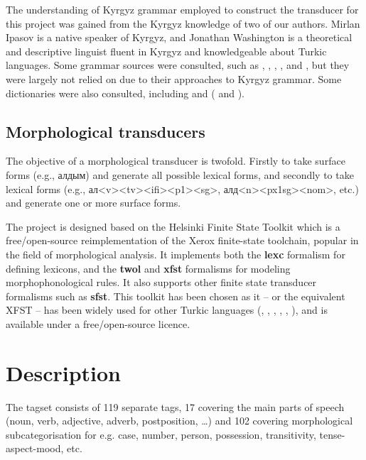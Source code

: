 \documentclass[10pt,a4paper,twocolumn]{article}
\newcommand{\citemultileft}[1]{(\citeauthor{#1}, \citeyear{#1}}
\newcommand{\citemultimid}[1]{\citeauthor{#1}, \citeyear{#1}}
\newcommand{\citemultiright}[1]{\citeauthor{#1}, \citeyear{#1})}
\newcommand{\citetwoyears}[2]{\citeauthor{#1} (\citeyear{#1} and \citeyear{#2})}
\begin{document}
The understanding of Kyrgyz grammar employed to construct the transducer for this project was gained from the Kyrgyz knowledge of two of our authors.  Mirlan Ipasov is a native speaker of Kyrgyz, and Jonathan Washington is a theoretical and descriptive linguist fluent in Kyrgyz and knowledgeable about Turkic languages.  Some grammar sources were consulted, such as \cite{hebertpoppe1963}, \cite{usonalievomuraliev2003}, \cite{qudaybergenov1980}, \cite{somfaikara2003}, and \cite{imart1981}, but they were largely not relied on due to their approaches to Kyrgyz grammar.  Some dictionaries were also consulted, including \cite{jumakunova2005} and \citetwoyears{yudakhin1957}{yudakhin1965}.

\subsection{Morphological transducers}
The objective of a morphological transducer is twofold. Firstly to take surface forms (e.g., алдым) and generate all possible lexical forms, and secondly to take lexical forms (e.g.,  ал<v><tv><ifi><p1><sg>, алд<n><px1sg><nom>, etc.) and generate one or more surface forms. 

The project is designed based on the Helsinki Finite State Toolkit \citep{linden2011} which is a free/open-source reimplementation of the Xerox finite-state toolchain, popular in the field of morphological analysis. It implements both the \textbf{lexc} formalism for defining lexicons, and the \textbf{twol} and \textbf{xfst} formalisms for modeling morphophonological rules. It also supports other finite state transducer formalisms such as \textbf{sfst}. This toolkit has been chosen as it -- or the equivalent XFST -- has been widely used for other Turkic languages \citemultileft{coltekin2010}, \citemultimid{altinasi2001}, \citemultiright{tantug2006}, and is available under a free/open-source licence.

\section{Description}
The tagset consists of 119 separate tags, 17 covering the main parts of speech (noun, verb, adjective, adverb, postposition, \ldots{}) and 102 covering morphological subcategorisation for e.g. case, number, person, possession, transitivity, tense-aspect-mood, etc.
\end{document}
